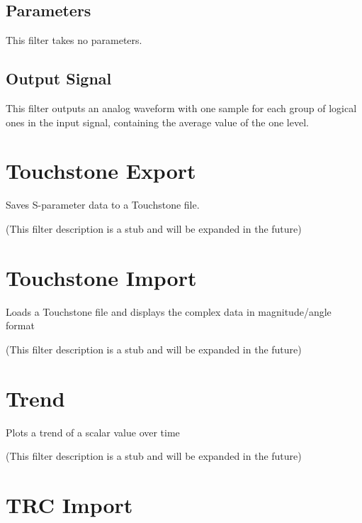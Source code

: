 \subsection{Parameters}

This filter takes no parameters.

\subsection{Output Signal}

This filter outputs an analog waveform with one sample for each group of logical ones in the input signal, containing
the average value of the one level.

\pagebreak
\section{Touchstone Export}

Saves S-parameter data to a Touchstone file.

(This filter description is a stub and will be expanded in the future)

\pagebreak
\section{Touchstone Import}

Loads a Touchstone file and displays the complex data in magnitude/angle format

(This filter description is a stub and will be expanded in the future)

\pagebreak
\section{Trend}

Plots a trend of a scalar value over time

(This filter description is a stub and will be expanded in the future)

\pagebreak
\section{TRC Import}

